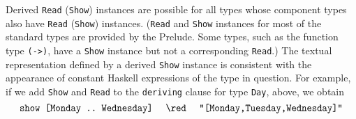 Derived \mbox{\tt Read} (\mbox{\tt Show}) instances are possible for all types
whose component types also have \mbox{\tt Read} (\mbox{\tt Show}) instances.
(\mbox{\tt Read} and \mbox{\tt Show} instances for most of the standard types
are provided by the Prelude.  Some types, such as the function type \mbox{\tt (->)},
have a \mbox{\tt Show} instance but not a corresponding \mbox{\tt Read}.)  The textual
representation 
defined by a derived \mbox{\tt Show} instance is consistent with the
appearance of constant Haskell expressions of the type in question.
For example, if we add \mbox{\tt Show} and \mbox{\tt Read} to the \mbox{\tt deriving} clause for type
\mbox{\tt Day}, above, we obtain
\[ \mbox{\tt show\ [Monday\ ..\ Wednesday]}\ \ \ \ \red\ \ \ \ 
   \mbox{\tt "[Monday,Tuesday,Wednesday]"}
\]

